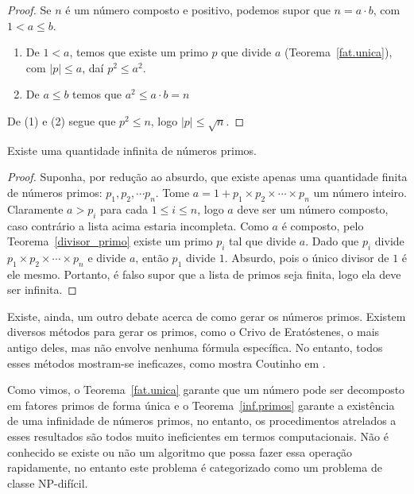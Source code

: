 \begin{proof}
Se $n$ \'e um n\'umero composto e positivo, podemos supor que $n=a\cdot b$, com $1<a\leq b$.
\begin{enumerate}
\item De $1<a$, temos que existe um primo $p$ que divide $a$ (Teorema~\ref{fat.unica}), com $|p|\leq a$, da\'i $p^2\leq a^2$.
\item De $a\leq b$ temos que $a^2\leq a\cdot b=n$
\end{enumerate}
De (1) e (2) segue que $p^2\leq n$, logo $|p|\leq\sqrt{n}$.
\end{proof}

\begin{Th}\label{inf.primos}
Existe uma quantidade infinita de n\'umeros primos.
\end{Th}

\begin{proof}
Suponha, por redu\c{c}\~ao ao absurdo, que existe apenas uma quantidade finita de n\'umeros primos: $p_1, p_2,\cdots p_n$. Tome $a=1+p_1\times p_2\times \cdots \times p_n$ um n\'umero inteiro. Claramente $a>p_i$ para cada $1\leq i\leq n$, logo $a$ deve ser um n\'umero composto, caso contr\'ario a lista acima estaria incompleta. Como $a$ \'{e} composto, pelo Teorema~\ref{divisor_primo} existe um primo $p_i$ tal que 
divide $a$. Dado que $p_i$ divide $p_1\times p_2\times \cdots \times p_n$ e divide $a$, ent\~ao $p_1$ divide $1$. Absurdo, pois o \'unico divisor de $1$ \'e ele mesmo. Portanto, \'e falso supor que a lista de primos seja finita, logo ela deve ser infinita.
\end{proof}

Existe, ainda, um outro debate acerca de como gerar os n\'umeros primos. Existem diversos m\'etodos para gerar os primos, como o Crivo 
de Erat\'ostenes, o mais antigo deles, mas n\~ao envolve nenhuma f\'ormula espec\'ifica. No entanto, todos esses 
m\'etodos mostram-se ineficazes, como mostra Coutinho em \cite{cou:2014}.

Como vimos, o Teorema~\ref{fat.unica} garante que um n\'umero pode ser decomposto em fatores primos de forma \'unica e o Teorema~\ref{inf.primos} garante a exist\^{e}ncia de uma infinidade de n\'umeros primos, no entanto, os procedimentos atrelados a esses resultados s\~ao todos muito ineficientes em termos computacionais. N\~ao \'e conhecido se existe ou n\~ao um algoritmo que possa fazer essa opera\c{c}\~ao rapidamente, no entanto este problema \'e categorizado como um problema de classe NP-dif\'icil.

